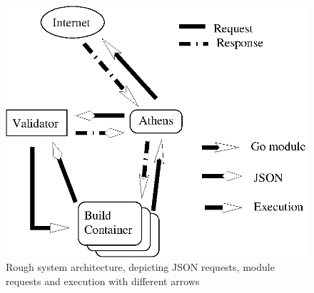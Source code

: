 \begin{figure}[ht]
  \label{fig:architecture}
  \caption{Rough system architecture, depicting JSON requests, module requests and execution with different arrows}
  \includegraphics{architecture.eps}
\end{figure}
